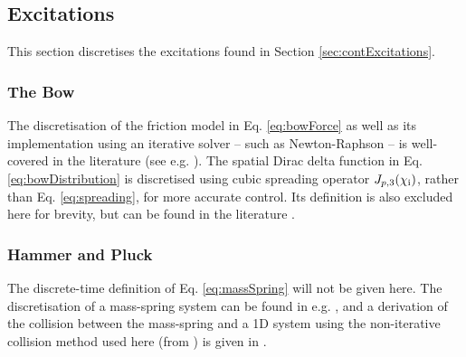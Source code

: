 \documentclass{article}
\begin{document}
\subsection{Excitations}\label{sec:discExcitations}
This section discretises the excitations found in Section \ref{sec:contExcitations}. 

\subsubsection{The Bow}
The discretisation of the friction model in Eq. \eqref{eq:bowForce} as well as its implementation using an iterative solver -- such as Newton-Raphson -- is well-covered in the literature (see e.g. \cite[Ch. 8]{WillemsenThesis}). The spatial Dirac delta function in Eq. \eqref{eq:bowDistribution} is discretised using cubic spreading operator $J_{p,3}(\chi_{\text{i}})$, rather than Eq. \eqref{eq:spreading}, for more accurate control. Its definition is also excluded here for brevity, but can be found in the literature \cite[Sec. 5.2.4]{theBible}.

\subsubsection{Hammer and Pluck}
The discrete-time definition of Eq. \eqref{eq:massSpring} will not be given here. The discretisation of a mass-spring system can be found in e.g. \cite{Bilbao2009Modular, Willemsen2020}, and a derivation of the collision between the mass-spring and a 1D system using the non-iterative collision method used here (from \cite{Ducceschi2021}) is given in \cite[Sec. 10.2]{WillemsenThesis}.
\end{document}
